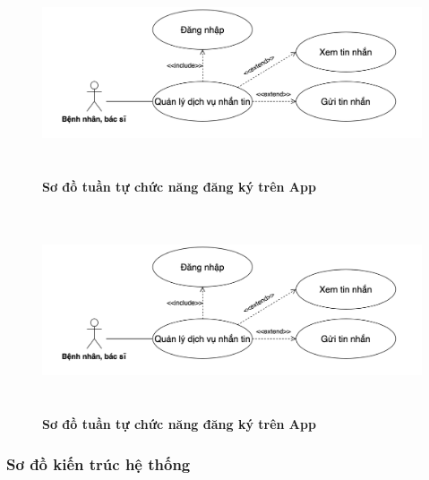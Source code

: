   \begin{figure}[H]
    \centering
    \includegraphics[width=15cm,height=6cm]{Images/mobile_app/use_case_send_receive_message.png}
    \caption[Sơ đồ tuần tự chức năng đăng ký trên App]{\bfseries \fontsize{12pt}{0pt}
    \selectfont Sơ đồ tuần tự chức năng đăng ký trên App}
    \label{hinh21} %
  \end{figure}

  \begin{figure}[H]
    \centering
    \includegraphics[width=15cm,height=6cm]{Images/mobile_app/use_case_send_receive_message.png}
    \caption[Sơ đồ tuần tự chức năng đăng ký trên App]{\bfseries \fontsize{12pt}{0pt}
    \selectfont Sơ đồ tuần tự chức năng đăng ký trên App}
    \label{hinh21} %
  \end{figure}


\subsubsection{Sơ đồ kiến trúc hệ thống}

